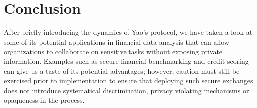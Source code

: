 \documentclass[12pt]{article}
\begin{document}
\section{Conclusion}\label{sec:conclusions}

After briefly introducing the dynamics of Yao's protocol, we have taken a look at some of its potential applications in financial data analysis that can allow organizations to collaborate on sensitive tasks without exposing private information. Examples such as secure financial benchmarking and credit scoring can give us a taste of its potential advantages; however, caution must still be exercised prior to implementation to ensure that deploying such secure exchanges does not introduce systematical discrimination, privacy violating mechanisms or opaqueness in the process.

{\footnotesize

}
\end{document}
